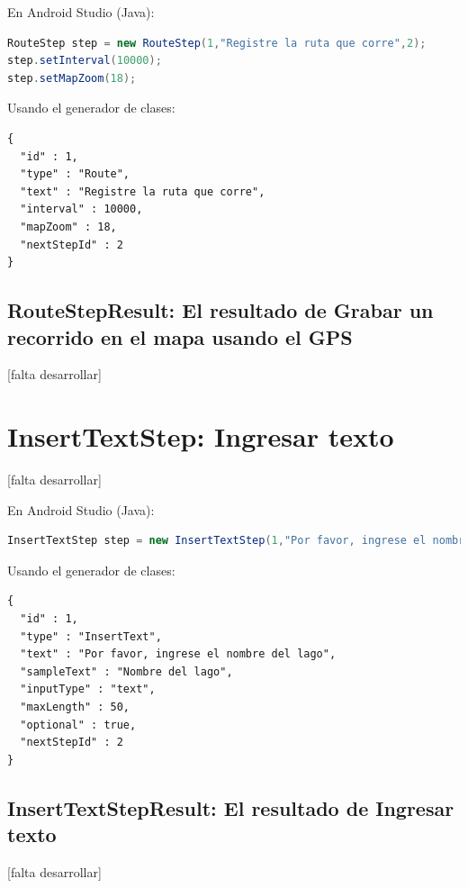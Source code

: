 En Android Studio (Java):
\begin{lstlisting}[language=Java, frame=tlb]	
RouteStep step = new RouteStep(1,"Registre la ruta que corre",2); 
step.setInterval(10000);
step.setMapZoom(18);
\end{lstlisting}

Usando el generador de clases:
\begin{lstlisting}[language=XML, frame=tlb]	
{
  "id" : 1,
  "type" : "Route",
  "text" : "Registre la ruta que corre",
  "interval" : 10000,
  "mapZoom" : 18,
  "nextStepId" : 2
}
\end{lstlisting}

\subsection{RouteStepResult: El resultado de Grabar un recorrido en el mapa usando el GPS}
[falta desarrollar]

\section{InsertTextStep: Ingresar texto}
[falta desarrollar]

En Android Studio (Java):
\begin{lstlisting}[language=Java, frame=tlb]	
InsertTextStep step = new InsertTextStep(1,"Por favor, ingrese el nombre del lago","Nombre del lago",50,InsertTextStep.InputType.TYPE_TEXT,true,2);
\end{lstlisting}

Usando el generador de clases:
\begin{lstlisting}[language=XML, frame=tlb]	
{
  "id" : 1,
  "type" : "InsertText",
  "text" : "Por favor, ingrese el nombre del lago",
  "sampleText" : "Nombre del lago",
  "inputType" : "text",
  "maxLength" : 50,
  "optional" : true,
  "nextStepId" : 2
}
\end{lstlisting}

\subsection{InsertTextStepResult: El resultado de Ingresar texto}
[falta desarrollar]

